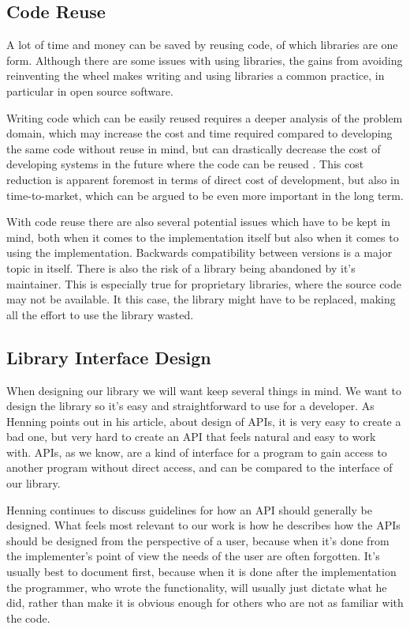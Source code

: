 \documentclass{sigchi-alternate}
\begin{document}
\subsection{Code Reuse}
A lot of time and money can be saved by reusing code, of which libraries are one form. Although there are
some issues with using libraries, the gains from avoiding reinventing the wheel makes writing and using
libraries a common practice, in particular in open source software\autocite{2998479020080101}.

Writing code which can be easily reused requires a deeper analysis of the problem domain, which may increase the cost and time required compared 
to developing the same code without reuse in mind, but can drastically decrease the cost of developing systems in the future where the code can 
be reused \autocite{lim1994effects}. This cost reduction is apparent foremost in terms of direct cost of development, but also in time-to-market, 
which can be argued to be even more important in the long term\autocite{griss1993software}.

With code reuse there are also several potential issues which have to be kept in mind, both when it comes to the implementation itself but also 
when it comes to using the implementation. Backwards compatibility between versions is a major topic in itself\autocite{raemaekers2012measuring}. There 
is also the risk of a library being abandoned by it’s maintainer. This is especially true for proprietary libraries, where the source code may not 
be available. It this case, the library might have to be replaced, making all the effort to use the library wasted.

\subsection{Library Interface Design}
When designing our library we will want keep several things in mind. We want to design the library so it’s easy and straightforward to use for a 
developer. As Henning points out in his article\autocite{Henning:2007:ADM:1255421.1255422}, about design of APIs, it is very easy to create a bad one, 
but very hard to create an API that feels natural and easy to work with. APIs, as we know, are a kind of interface for a program to gain access to 
another program without direct access, and can be compared to the interface of our library.

Henning continues to discuss guidelines for how an API should generally be designed. What feels most relevant to our work is how 
he describes how the APIs should be designed from the perspective of a user, because when it’s done from the implementer's point of view the 
needs of the user are often forgotten. It’s usually best to document first, because when it is done after the implementation the programmer, who 
wrote the functionality, will usually just dictate what he did, rather than make it is obvious enough for others who are not as familiar with the code.
\end{document}
